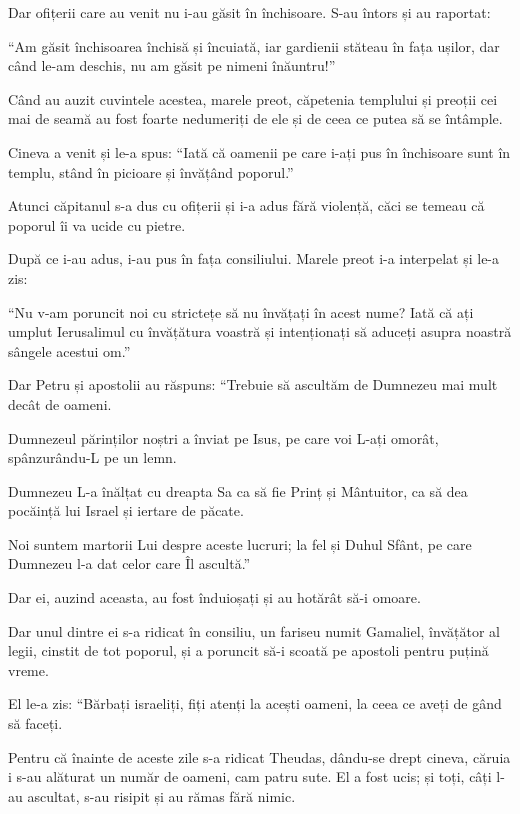 {Dar ofițerii care au venit nu i-au găsit în închisoare. S-au întors și au raportat:

“Am găsit închisoarea închisă și încuiată, iar gardienii stăteau în fața ușilor, dar când le-am deschis, nu am găsit pe nimeni înăuntru!”


\par }{\PP {}Când au auzit cuvintele acestea, marele preot, căpetenia templului și preoții cei mai de seamă au fost foarte nedumeriți de ele și de ceea ce putea să se întâmple.

Cineva a venit și le-a spus: “Iată că oamenii pe care i-ați pus în închisoare sunt în templu, stând în picioare și învățând poporul.”

Atunci căpitanul s-a dus cu ofițerii și i-a adus fără violență, căci se temeau că poporul îi va ucide cu pietre.


\par }{\PP {}După ce i-au adus, i-au pus în fața consiliului. Marele preot i-a interpelat și le-a zis:

“Nu v-am poruncit noi cu strictețe să nu învățați în acest nume? Iată că ați umplut Ierusalimul cu învățătura voastră și intenționați să aduceți asupra noastră sângele acestui om.”


\par }{\PP {}Dar Petru și apostolii au răspuns: “Trebuie să ascultăm de Dumnezeu mai mult decât de oameni.

Dumnezeul părinților noștri a înviat pe Isus, pe care voi L-ați omorât, spânzurându-L pe un lemn.

Dumnezeu L-a înălțat cu dreapta Sa ca să fie Prinț și Mântuitor, ca să dea pocăință lui Israel și iertare de păcate.

Noi suntem martorii Lui despre aceste lucruri; la fel și Duhul Sfânt, pe care Dumnezeu l-a dat celor care Îl ascultă.”


\par }{\PP {}Dar ei, auzind aceasta, au fost înduioșați și au hotărât să-i omoare.

Dar unul dintre ei s-a ridicat în consiliu, un fariseu numit Gamaliel, învățător al legii, cinstit de tot poporul, și a poruncit să-i scoată pe apostoli pentru puțină vreme.

El le-a zis: “Bărbați israeliți, fiți atenți la acești oameni, la ceea ce aveți de gând să faceți.

Pentru că înainte de aceste zile s-a ridicat Theudas, dându-se drept cineva, căruia i s-au alăturat un număr de oameni, cam patru sute. El a fost ucis; și toți, câți l-au ascultat, s-au risipit și au rămas fără nimic.

}
